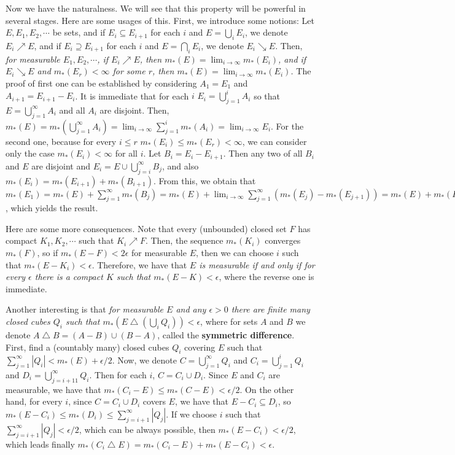 \documentclass{article}
\begin{document}
Now we have the naturalness.
We will see that this property will be powerful in several stages.
Here are some usages of this.
First, we introduce some notions: Let $E, E_1, E_2, \cdots$ be sets, and if $E_i \subseteq E_{i + 1}$ for each $i$ and $E = \bigcup_i E_i$, we denote $E_i \nearrow E$, and if $E_i \supseteq E_{i + 1}$ for each $i$ and $E = \bigcap_i E_i$, we denote $E_i \searrow E$.
Then, \textit{for measurable $E_1, E_2, \cdots$, if $E_i \nearrow E$, then $m_*(E) = \lim_{i \to \infty} m_*(E_i)$, and if $E_i \searrow E$ and $m_*(E_r) < \infty$ for some $r$, then $m_*(E) = \lim_{i \to \infty} m_*(E_i)$.}
The proof of first one can be established by considering $A_1 = E_1$ and $A_{i + 1} = E_{i + 1} - E_i$.
It is immediate that for each $i$ $E_i = \bigcup_{j = 1}^i A_i$ so that $E = \bigcup_{j = 1}^\infty A_i$ and all $A_i$ are disjoint.
Then, $m_*(E) = m_*(\bigcup_{j = 1}^\infty A_i) = \lim_{i \to \infty} \sum_{j = 1}^i m_*(A_i) = \lim_{i \to \infty} E_i$.
For the second one, because for every $i \le r$ $m_*(E_i) \le m_*(E_r) < \infty$, we can consider only the case $m_*(E_i) < \infty$ for all $i$.
Let $B_i = E_i - E_{i + 1}$.
Then any two of all $B_i$ and $E$ are disjoint and $E_i = E \cup \bigcup_{j = i}^\infty B_j$, and also $m_*(E_i) = m_*(E_{i + 1}) + m_*(B_{i + 1})$.
From this, we obtain that $m_*(E_1) = m_*(E) + \sum_{j = 1}^\infty m_*(B_j) = m_*(E) + \lim_{i \to \infty} \sum_{j = 1}^\infty ( m_*(E_j) - m_*(E_{j + 1}) ) = m_*(E) + m_*(E_1) - \lim_{i \to \infty} m_*(E_i)$, which yields the result.

Here are some more consequences.
Note that every (unbounded) closed set $F$ has compact $K_1, K_2, \cdots$ such that $K_i \nearrow F$.
Then, the sequence $m_*(K_i)$ converges $m_*(F)$, so if $m_*(E - F) < 2\epsilon$ for measurable $E$, then we can choose $i$ such that $m_*(E - K_i) < \epsilon$.
Therefore, we have that \textit{$E$ is measurable if and only if for every $\epsilon$ there is a compact $K$ such that $m_*(E - K) < \epsilon$}, where the reverse one is immediate.

Another interesting is that \textit{for measurable $E$ and any $\epsilon > 0$ there are finite many closed cubes $Q_i$ such that $m_*(E \bigtriangleup \left( \bigcup_i Q_i \right)) < \epsilon$}, where for sets $A$ and $B$ we denote $A \bigtriangleup B = (A - B) \cup (B - A)$, called the \textbf{symmetric difference}.
First, find a (countably many) closed cubes $Q_i$ covering $E$ such that $\sum_{j = 1}^\infty |Q_i| < m_*(E) + \epsilon / 2$.
Now, we denote $C = \bigcup_{j = 1}^\infty Q_i$ and $C_i = \bigcup_{j = 1}^i Q_i$ and $D_i = \bigcup_{j = i + 11}^\infty Q_i$.
Then for each $i$, $C = C_i \cup D_i$.
Since $E$ and $C_i$ are measurable, we have that $m_*(C_i - E) \le m_*(C - E) < \epsilon / 2$.
On the other hand, for every $i$, since $C = C_i \cup D_i$ covers $E$, we have that $E - C_i \subseteq D_i$, so $m_*(E - C_i) \le m_*(D_i) \le \sum_{j = i + 1}^\infty |Q_j|$.
If we choose $i$ such that $\sum_{j = i + 1}^\infty |Q_j| < \epsilon / 2$, which can be always possible, then $m_*(E - C_i) < \epsilon / 2$, which leads finally $m_*(C_i \bigtriangleup E) = m_*(C_i - E) + m_*(E - C_i) < \epsilon$.
\end{document}
